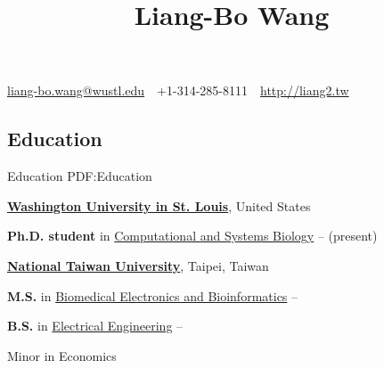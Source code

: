 \documentclass[a4paper,12pt,oneside]{article}
\begin{document}

\title{Liang-Bo Wang}

\begin{subtitle}
\href{mailto:liang-bo.wang@wustl.edu}
{liang-bo.wang@wustl.edu}
\,\BulletSymbol\,
+1-314-285-8111
\,\BulletSymbol\,
\href{http://liang2.tw}
{http://liang2.tw}
\end{subtitle}

\begin{body}


\section
{Education}
{Education}
{PDF:Education}


\href{https://wustl.edu/}
{\textbf{Washington University in St. Louis}},
United States
\par
\textbf{Ph.D. student} in
\href{http://dbbs.wustl.edu/divprograms/compbio/Pages/default.aspx}
{Computational and Systems Biology}
\hfill
{} --
(present)

\BigEntryGap

\href{http://www.ntu.edu.tw/english/index.html}
{\textbf{National Taiwan University}},
Taipei, Taiwan
\par
\textbf{M.S.} in
\href{http://www.bebi.ntu.edu.tw/English/index.html}
{Biomedical Electronics and Bioinformatics}
\hfill
{} --


\EntryGapNoBreak
\textbf{B.S.} in
\href{http://www.ee.ntu.edu.tw/en/}
{Electrical Engineering}
\hfill
{} --
\begin{detail}
    \begin{detailitem}
    \item Minor in Economics
    \end{detailitem}
\end{detail}


\end{body}
\end{document}
